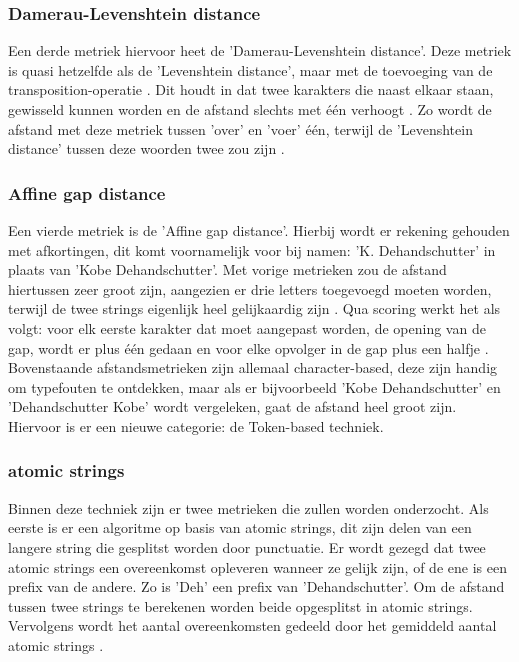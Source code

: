 \subsubsection{Damerau-Levenshtein distance}
Een derde metriek hiervoor heet de 'Damerau-Levenshtein distance'. Deze metriek is quasi hetzelfde als de 'Levenshtein distance', maar met de toevoeging van de transposition-operatie \autocite{Wikiversity2022}. Dit houdt in dat twee karakters die naast elkaar staan, gewisseld kunnen worden en de afstand slechts met één verhoogt . Zo wordt de afstand met deze metriek tussen 'over' en 'voer' één, terwijl de 'Levenshtein distance' tussen deze woorden twee zou zijn \autocite{Pypi2020}.
\subsubsection{Affine gap distance}
Een vierde metriek is de 'Affine gap distance'. Hierbij wordt er rekening gehouden met afkortingen, dit komt voornamelijk voor bij namen: 'K. Dehandschutter' in plaats van 'Kobe Dehandschutter'. Met vorige metrieken zou de afstand hiertussen zeer groot zijn, aangezien er drie letters toegevoegd moeten worden, terwijl de twee strings eigenlijk heel gelijkaardig zijn \autocite{Walgran2019}. Qua scoring werkt het als volgt: voor elk eerste karakter dat moet aangepast worden, de opening van de gap, wordt er plus één gedaan en voor elke opvolger in de gap plus een halfje \autocite{Lievens2022}.
\\\indent
Bovenstaande afstandsmetrieken zijn allemaal character-based, deze zijn handig om typefouten te ontdekken, maar als er bijvoorbeeld 'Kobe Dehandschutter' en 'Dehandschutter Kobe' wordt vergeleken, gaat de afstand heel groot zijn. Hiervoor is er een nieuwe categorie: de Token-based techniek.
\subsubsection{atomic strings}
Binnen deze techniek zijn er twee metrieken die zullen worden onderzocht. Als eerste is er een algoritme op basis van atomic strings, dit zijn delen van een langere string die gesplitst worden door punctuatie. Er wordt gezegd dat twee atomic strings een overeenkomst opleveren wanneer ze gelijk zijn, of de ene is een prefix van de andere. Zo is 'Deh' een prefix van 'Dehandschutter'. Om de afstand tussen twee strings te berekenen worden beide opgesplitst in atomic strings. Vervolgens wordt het aantal overeenkomsten gedeeld door het gemiddeld aantal atomic strings \autocite{Lievens2022}.
